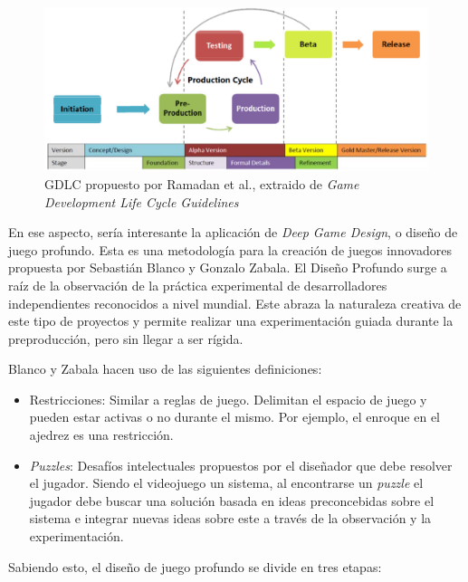 \begin{figure}[h]
    \centering
    \includegraphics[scale=0.3]{img/ramadan-diagram.png}
    \caption[GDLC propuesto por Ramadan et al.]{GDLC propuesto por Ramadan et al., extraido de \textit{Game Development Life Cycle Guidelines}\cite{ramadan}}
    \label{fig:ramadan}
\end{figure}

En ese aspecto, sería interesante la aplicación de \textit{Deep Game Design}, o diseño de juego profundo. Esta es una metodología para la creación de juegos innovadores propuesta por Sebastián Blanco y Gonzalo Zabala\cite{deepdesign}. El Diseño Profundo surge a raíz de la observación de la práctica experimental de desarrolladores independientes reconocidos a nivel mundial. Este abraza la naturaleza creativa de este tipo de proyectos y permite realizar una experimentación guiada durante la preproducción, pero sin llegar a ser rígida.

Blanco y Zabala hacen uso de las siguientes definiciones:

\begin{itemize}
    \item Restricciones: Similar a reglas de juego. Delimitan el espacio de juego y pueden estar activas o no durante el mismo. Por ejemplo, el enroque en el ajedrez es una restricción.
    \item \textit{Puzzles}: Desafíos intelectuales propuestos por el diseñador que debe resolver el jugador. Siendo el videojuego un sistema, al encontrarse un \textit{puzzle} el jugador debe buscar una solución basada en ideas preconcebidas sobre el sistema e integrar nuevas ideas sobre este a través de la observación y la experimentación.
\end{itemize}

Sabiendo esto, el diseño de juego profundo se divide en tres etapas:

